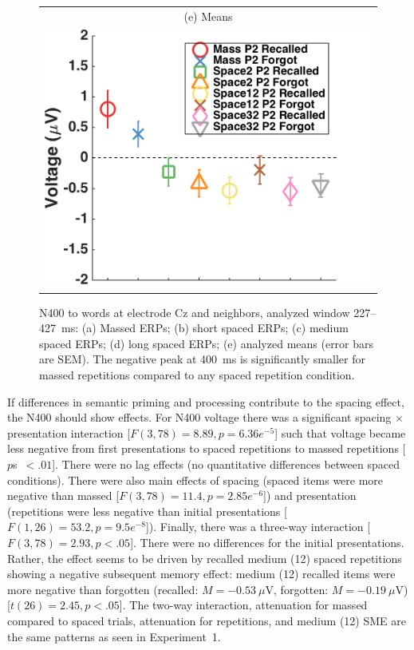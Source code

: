 \begin{figure}[hp]
\begin{tabular}{cc}
  \multicolumn{2}{c}{(e) Means} \\
  \multicolumn{2}{c}{\includegraphics[width=.35\textwidth]{./figs/exp2/tla_avg_ga_word_rc_mass_p2_word_fo_mass_p2_word_rc_spac2_p2_word_fo_spac2_p2_word_rc_spac12_p2_word_fo_spac12_p2_word_rc_spac32_p2_word_fo_spac32_p2_C_277_427_ylabel}} \\
  \end{tabular}
  \caption{N400 to words at electrode Cz and neighbors, analyzed window 227--427~ms: (a) Massed ERPs; (b) short spaced ERPs; (c) medium spaced ERPs; (d) long spaced ERPs; (e) analyzed means (error bars are SEM).  The negative peak at 400~ms is significantly smaller for massed repetitions compared to any spaced repetition condition.}
  \label{fig:s2_N400}
\end{figure}


If differences in semantic priming and processing contribute to the spacing effect, the N400 should show effects.
For N400 voltage there was a significant spacing $\times$ presentation interaction [$F(3,78)=8.89, p=6.36e^{-5}$] such that voltage became less negative from first presentations to spaced repetitions to massed repetitions [$p$s~$<.01$].  There were no lag effects (no quantitative differences between spaced conditions).  There were also main effects of spacing (spaced items were more negative than massed [$F(3,78)=11.4, p=2.85e^{-6}$]) and presentation (repetitions were less negative than initial presentations [$F(1,26)=53.2, p=9.5e^{-8}$]).  Finally, there was a three-way interaction [$F(3,78)=2.93, p<.05$].  There were no differences for the initial presentations.  Rather, the effect seems to be driven by recalled medium (12) spaced repetitions showing a negative subsequent memory effect: medium (12) recalled items were more negative than forgotten (recalled: $M=-0.53~\mu$V, forgotten: $M=-0.19~\mu$V) [$t(26)=2.45, p<.05$].  
The two-way interaction, attenuation for massed compared to spaced trials, attenuation for repetitions, and medium (12) SME are the same patterns as seen in Experiment~1.


